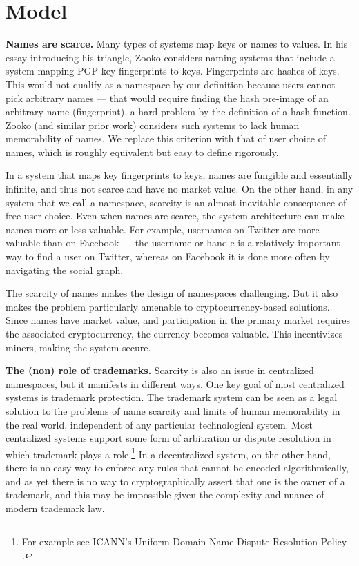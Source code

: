 \section{Model}
\label{sec:model}

{\bf Names are scarce.} Many types of systems map keys or names to values. In his essay introducing his triangle, Zooko considers naming systems that include a system mapping PGP key fingerprints to keys. Fingerprints are hashes of keys. This would not qualify as a namespace by our definition because users cannot pick arbitrary names --- that would require finding the hash pre-image of an arbitrary name (fingerprint), a hard problem by the definition of a hash function. Zooko (and similar prior work) considers such systems to lack human memorability of names. We replace this criterion with that of user choice of names, which is roughly equivalent but easy to define rigorously. 

In a system that maps key fingerprints to keys, names are fungible and essentially infinite, and thus not scarce and have no market value. On the other hand, in any system that we call a namespace, scarcity is an almost inevitable consequence of free user choice. Even when names are scarce, the system architecture can make names more or less valuable. For example, usernames on Twitter are more valuable than on Facebook --- the username or handle is a relatively important way to find a user on Twitter, whereas on Facebook it is done more often by navigating the social graph.

The scarcity of names makes the design of namespaces challenging. But it also makes the problem particularly amenable to cryptocurrency-based solutions. Since names have market value, and participation in the primary market requires the associated cryptocurrency, the currency becomes valuable. This incentivizes miners, making the system secure.

{\bf The (non) role of trademarks.} Scarcity is also an issue in centralized namespaces, but it manifests in different ways. One key goal of most centralized systems is trademark protection. The trademark system can be seen as a legal solution to the problems of name scarcity and limits of human memorability in the real world, independent of any particular technological system. Most centralized systems support some form of arbitration or dispute resolution in which trademark plays a role.\footnote{For example see ICANN's Uniform Domain-Name Dispute-Resolution Policy \cite{walker2000icann}.} In a decentralized system, on the other hand, there is no easy way to enforce any rules that cannot be encoded algorithmically, and as yet there is no way to cryptographically assert that one is the owner of a trademark, and this may be impossible given the complexity and nuance of modern trademark law.

